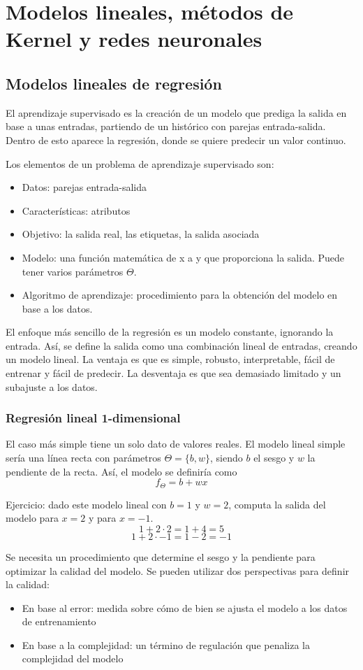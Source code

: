 \chapter{Modelos lineales, métodos de Kernel y redes neuronales}
\section{Modelos lineales de regresión}
El aprendizaje supervisado es la creación de un modelo que prediga la salida en base a unas entradas, partiendo de un histórico con parejas entrada-salida. Dentro de esto aparece la regresión, donde se quiere predecir un valor continuo. 

Los elementos de un problema de aprendizaje supervisado son:
\begin{itemize}
\item Datos: parejas entrada-salida
\item Características: atributos
\item Objetivo: la salida real, las etiquetas, la salida asociada
\item Modelo: una función matemática de x a y que proporciona la salida. Puede tener varios parámetros $\Theta$.
\item Algoritmo de aprendizaje: procedimiento para la obtención del modelo en base a los datos.
\end{itemize}

El enfoque más sencillo de la regresión es un modelo constante, ignorando la entrada. Así, se define la salida como una combinación lineal de entradas, creando un modelo lineal. La ventaja es que es simple, robusto, interpretable, fácil de entrenar y fácil de predecir. La desventaja es que sea demasiado limitado y un subajuste a los datos.

\subsection{Regresión lineal 1-dimensional}
El caso más simple tiene un solo dato de valores reales. El modelo lineal simple sería una línea recta con parámetros $\Theta = \{b, w\}$, siendo $b$ el sesgo y $w$ la pendiente de la recta. Así, el modelo se definiría como
$$f_{\Theta} = b + wx$$

Ejercicio: dado este modelo lineal con $b=1$ y $w=2$, computa la salida del modelo para $x=2$ y para $x=-1$.
$$1 + 2 \cdot 2 = 1 + 4 = 5$$
$$1 + 2 \cdot -1 = 1 - 2 = -1 $$

Se necesita un procedimiento que determine el sesgo y la pendiente para optimizar la calidad del modelo. Se pueden utilizar dos perspectivas para definir la calidad: 
\begin{itemize}
\item En base al error: medida sobre cómo de bien se ajusta el modelo a los datos de entrenamiento
\item En base a la complejidad: un término de regulación que penaliza la complejidad del modelo
\end{itemize}

